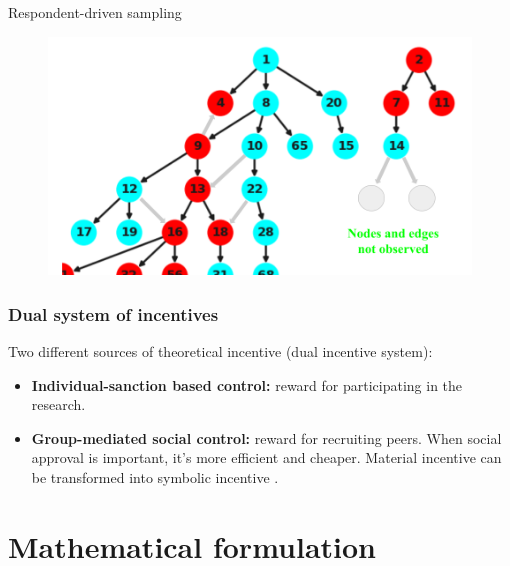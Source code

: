 \documentclass{beamer}
\newcommand{\Space}{\vspace{3ex}}
\begin{document}
\begin{frame}{Respondent-driven sampling}
\begin{figure}
\begin{overprint}
    \includegraphics[width=\textwidth]{../../images/graph-rds-harvard-4-english.png}
    \end{overprint}
  \end{figure}  
\end{frame}

\begin{frame}
  
  \frametitle{Dual system of incentives}
    
  Two different sources of theoretical incentive (dual incentive system):

  \Space

  \begin{itemize}
    \justifying
    \item<1> {\bf Individual-sanction based control:} reward for participating
    in the research. 

    \Space

    \item<2> {\bf Group-mediated social control:} reward for recruiting peers.
    When social approval is important, it's more efficient and cheaper.
    Material incentive can be transformed into symbolic incentive . 
  \end{itemize}

\end{frame}


\section{Mathematical formulation}
\end{document}
